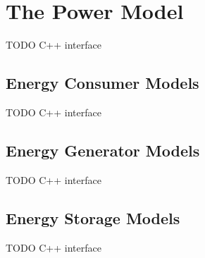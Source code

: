\chapter{The Power Model}
\label{cha:power}

TODO C++ interface

\section{Energy Consumer Models}

TODO C++ interface

\section{Energy Generator Models}

TODO C++ interface

\section{Energy Storage Models}

TODO C++ interface


